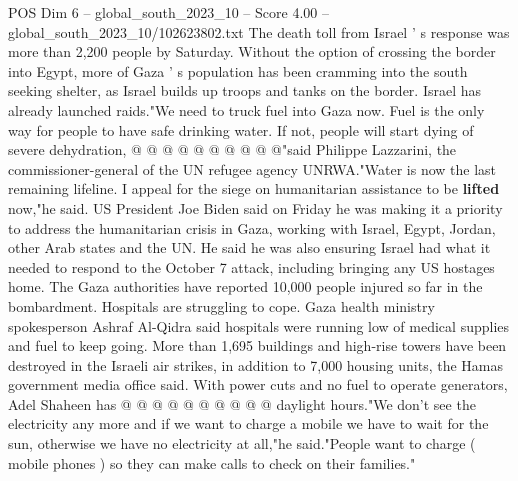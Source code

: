 \begin{textsample}{POS Dim 6 – global\_south\_2023\_10 – Score 4.00 – global\_south\_2023\_10/102623802.txt}
The death toll from Israel ' s response was more than 2,200 people by Saturday.
Without the option of crossing the border into Egypt, more of Gaza ' s population has been cramming into the south seeking shelter, as Israel builds up troops and tanks on the border.
Israel has already launched raids."We need to truck fuel into Gaza now.
Fuel is the only way for people to have safe drinking water.
If not, people will start dying of severe dehydration, @ @ @ @ @ @ @ @ @ @"said Philippe Lazzarini, the commissioner-general of the UN refugee agency UNRWA."Water is now the last remaining lifeline.
I appeal for the siege on humanitarian assistance to be \textbf{lifted} now,"he said.
US President Joe Biden said on Friday he was making it a priority to address the humanitarian crisis in Gaza, working with Israel, Egypt, Jordan, other Arab states and the UN.
He said he was also ensuring Israel had what it needed to respond to the October 7 attack, including bringing any US hostages home.
The Gaza authorities have reported 10,000 people injured so far in the bombardment.
Hospitals are struggling to cope.
Gaza health ministry spokesperson Ashraf Al-Qidra said hospitals were running low of medical supplies and fuel to keep going.
More than 1,695 buildings and high-rise towers have been destroyed in the Israeli air strikes, in addition to 7,000 housing units, the Hamas government media office said.
With power cuts and no fuel to operate generators, Adel Shaheen has @ @ @ @ @ @ @ @ @ @ daylight hours."We don't see the electricity any more and if we want to charge a mobile we have to wait for the sun, otherwise we have no electricity at all,"he said."People want to charge ( mobile phones ) so they can make calls to check on their families."

\end{textsample}
